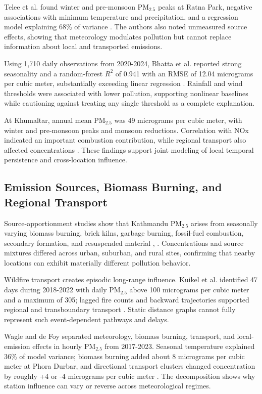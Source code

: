 Telee et al. found winter and pre-monsoon PM$_{2.5}$ peaks at Ratna Park, negative associations with minimum temperature and precipitation, and a regression model explaining 68\% of variance \cite{ref8}. The authors also noted unmeasured source effects, showing that meteorology modulates pollution but cannot replace information about local and transported emissions.

Using 1,710 daily observations from 2020-2024, Bhatta et al. reported strong seasonality and a random-forest $R^2$ of 0.941 with an RMSE of 12.04 micrograms per cubic meter, substantially exceeding linear regression \cite{ref9}. Rainfall and wind thresholds were associated with lower pollution, supporting nonlinear baselines while cautioning against treating any single threshold as a complete explanation.

At Khumaltar, annual mean PM$_{2.5}$ was 49 micrograms per cubic meter, with winter and pre-monsoon peaks and monsoon reductions. Correlation with NOx indicated an important combustion contribution, while regional transport also affected concentrations \cite{ref10}. These findings support joint modeling of local temporal persistence and cross-location influence.

\subsection{Emission Sources, Biomass Burning, and Regional Transport}

Source-apportionment studies show that Kathmandu PM$_{2.5}$ arises from seasonally varying biomass burning, brick kilns, garbage burning, fossil-fuel combustion, secondary formation, and resuspended material \cite{ref3}, \cite{ref4}. Concentrations and source mixtures differed across urban, suburban, and rural sites, confirming that nearby locations can exhibit materially different pollution behavior.

Wildfire transport creates episodic long-range influence. Kuikel et al. identified 47 days during 2018-2022 with daily PM$_{2.5}$ above 100 micrograms per cubic meter and a maximum of 305; lagged fire counts and backward trajectories supported regional and transboundary transport \cite{ref6}. Static distance graphs cannot fully represent such event-dependent pathways and delays.

Wagle and de Foy separated meteorology, biomass burning, transport, and local-emission effects in hourly PM$_{2.5}$ from 2017-2023. Seasonal temperature explained 36\% of model variance; biomass burning added about 8 micrograms per cubic meter at Phora Durbar, and directional transport clusters changed concentration by roughly +4 or -4 micrograms per cubic meter \cite{ref7}. The decomposition shows why station influence can vary or reverse across meteorological regimes.

